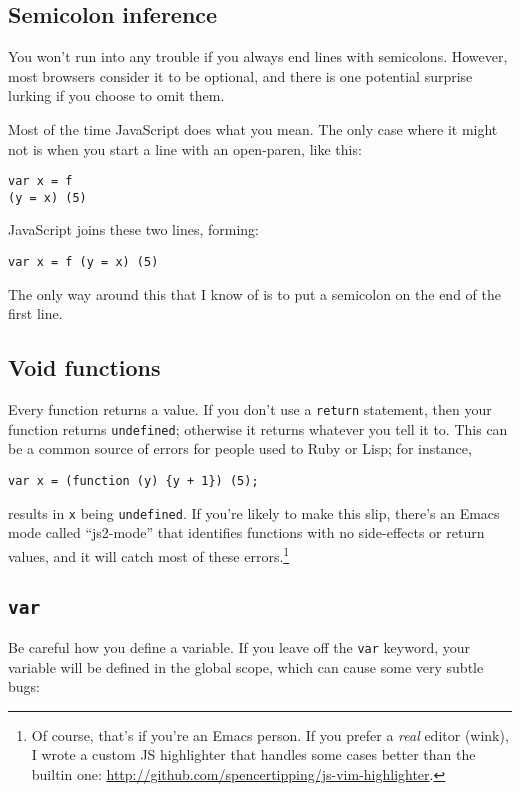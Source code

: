 \documentclass{article}
\begin{document}
\subsection {Semicolon inference}
    You won't run into any trouble if you always end lines with semicolons. However, most browsers consider it to be optional, and there is one potential surprise lurking if you choose to omit
    them.

    Most of the time JavaScript does what you mean. The only case where it might not is when you start a line with an open-paren, like this:

\begin{verbatim}
var x = f
(y = x) (5)
\end{verbatim}

    JavaScript joins these two lines, forming:

\begin{verbatim}
var x = f (y = x) (5)
\end{verbatim}

    The only way around this that I know of is to put a semicolon on the end of the first line.

\subsection {Void functions}
    Every function returns a value. If you don't use a \verb|return| statement, then your function returns \verb|undefined|; otherwise it returns whatever you tell it to. This can be a common
    source of errors for people used to Ruby or Lisp; for instance,

\begin{verbatim}
var x = (function (y) {y + 1}) (5);
\end{verbatim}

    \noindent results in \verb|x| being \verb|undefined|. If you're likely to make this slip, there's an Emacs mode called ``js2-mode'' that identifies functions with no side-effects or return
    values, and it will catch most of these errors.\footnote{Of course, that's if you're an Emacs person. If you prefer a {\it real} editor (wink), I wrote a custom JS highlighter that handles
    some cases better than the builtin one: \url{http://github.com/spencertipping/js-vim-highlighter}.}

\subsection {{\tt var}}
    Be careful how you define a variable. If you leave off the {\tt var} keyword, your variable will be defined in the global scope, which can cause some very subtle bugs:
\end{document}
